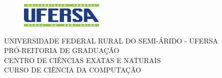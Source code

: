 \documentclass[
	12pt,				%
	openright,			%
	oneside,			%
	a4paper,			%
	english,			%
	brazil				%
	]{abntex2}
\begin{document}

\frenchspacing 

\renewcommand{\imprimircapa}{%
\begin{capa}%
\center
\begin{figure}
\centering
\includegraphics[width=150px]{figures/PNG-logo-Ufersa.png}
\end{figure}
\vspace*{-1.4cm}
\ABNTEXchapterfont UNIVERSIDADE FEDERAL RURAL DO SEMI-ÁRIDO - UFERSA \\
\ABNTEXchapterfont PRÓ-REITORIA DE GRADUAÇÃO \\
\ABNTEXchapterfont CENTRO DE CIÊNCIAS EXATAS E NATURAIS \\
\ABNTEXchapterfont CURSO DE CIÊNCIA DA COMPUTAÇÃO

\vspace*{3cm}

{\ABNTEXchapterfont\large\imprimirautor}

\vfill
\begin{center}
\ABNTEXchapterfont\bfseries\LARGE\imprimirtitulo
\end{center}
\vfill

\large\imprimirlocal

\large\imprimirdata

\vspace*{1cm}
\end{capa}
}


\imprimircapa

\end{document}
